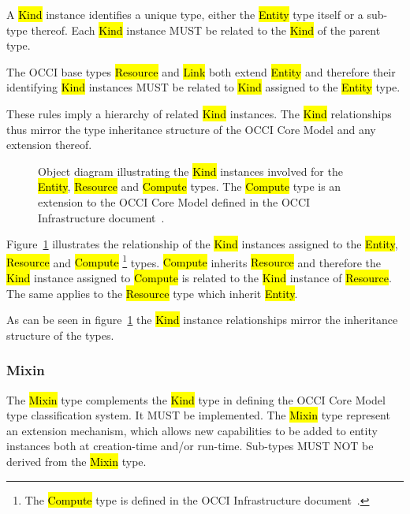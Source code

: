 \documentclass[10pt,a4paper]{article}
\begin{document}
A \hl{Kind} instance identifies a unique type, either the \hl{Entity}
type itself or a sub-type thereof.  Each \hl{Kind} instance MUST be
related to the \hl{Kind} of the parent type.

The OCCI base types \hl{Resource} and \hl{Link} both extend
\hl{Entity} and therefore their identifying \hl{Kind} instances MUST
be related to \hl{Kind} assigned to the \hl{Entity} type.

These rules imply a hierarchy of related \hl{Kind} instances. The
\hl{Kind} relationships thus mirror the type inheritance structure of
the OCCI Core Model and any extension thereof.

\begin{figure}[!h]
  {\centering {} \par}
  \caption{Object diagram illustrating the \hl{Kind} instances
    involved for the \hl{Entity}, \hl{Resource} and \hl{Compute}
    types. The \hl{Compute} type is an extension to the OCCI Core
    Model defined in the OCCI Infrastructure
    document~\cite{occi:infrastructure}.}
  \label{fig:kind_relationships}
\end{figure}

Figure~\ref{fig:kind_relationships} illustrates the relationship of
the \hl{Kind} instances assigned to the \hl{Entity}, \hl{Resource} and
\hl{Compute}%
\footnote{The \hl{Compute} type is defined in the OCCI Infrastructure
 document~\cite{occi:infrastructure}.}
types.
%
\hl{Compute} inherits \hl{Resource} and therefore the \hl{Kind}
instance assigned to \hl{Compute} is related to the \hl{Kind} instance
of \hl{Resource}.  The same applies to the \hl{Resource} type which
inherit \hl{Entity}.

As can be seen in figure~\ref{fig:kind_relationships} the \hl{Kind}
instance relationships mirror the inheritance structure of the types.


\subsubsection{Mixin}
\label{sec:mixin}
The \hl{Mixin} type complements the \hl{Kind} type in defining the
OCCI Core Model type classification system. It MUST be
implemented. The \hl{Mixin} type represent an extension mechanism,
which allows new capabilities to be added to entity
instances both at creation-time and/or run-time.
%
Sub-types MUST NOT be derived from the \hl{Mixin} type.
\end{document}
